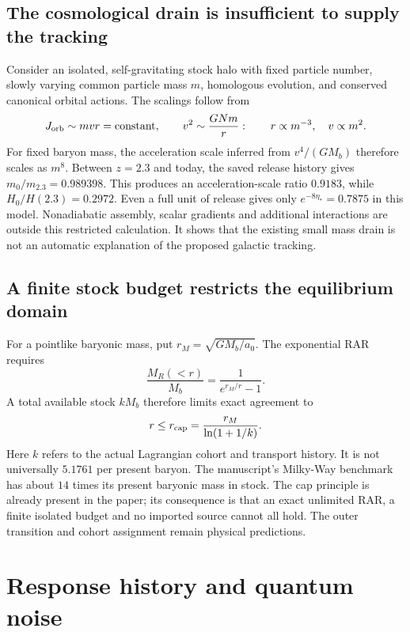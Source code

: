 \documentclass[11pt]{article}
\begin{document}
\subsection{The cosmological drain is insufficient to supply the tracking}
Consider an isolated, self-gravitating stock halo with fixed particle number,
slowly varying common particle mass $m$, homologous evolution, and conserved
canonical orbital actions. The scalings follow from
\begin{equation}
 J_{\rm orb}\sim mvr=\text{constant},\qquad
 v^2\sim\frac{GN m}{r}:
 \qquad r\propto m^{-3},\quad v\propto m^2.
\end{equation}
For fixed baryon mass, the acceleration scale inferred from $v^4/(GM_b)$
therefore scales as $m^8$. Between $z=2.3$ and today, the saved release history
gives $m_0/m_{2.3}=0.989398$. This produces an acceleration-scale ratio
$0.9183$, while $H_0/H(2.3)=0.2972$. Even a full unit of release gives only
$e^{-8\eta_*}=0.7875$ in this model. Nonadiabatic assembly, scalar gradients
and additional interactions are outside this restricted calculation. It
shows that the existing small mass drain is not an automatic explanation
of the proposed galactic tracking.

\subsection{A finite stock budget restricts the equilibrium domain}
For a pointlike baryonic mass, put $r_M=\sqrt{GM_b/a_0}$. The exponential
RAR requires
\begin{equation}
 \frac{M_R(<r)}{M_b}=\frac1{e^{r_M/r}-1}.
\end{equation}
A total available stock $kM_b$ therefore limits exact agreement to
\begin{equation}
 r\le r_{\rm cap}=\frac{r_M}{\ln(1+1/k)}.
\end{equation}
Here $k$ refers to the actual Lagrangian cohort and transport history.
It is not universally $5.1761$ per present baryon. The manuscript's Milky-Way
benchmark has about $14$ times its present baryonic mass in stock. The cap
principle is already present in the paper; its consequence is that an exact
unlimited RAR, a finite isolated budget and no imported source cannot all
hold. The outer transition and cohort assignment remain physical predictions.

\section{Response history and quantum noise}
\end{document}
